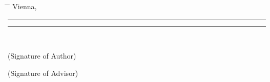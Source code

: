 \begin{center}
\begin{minipage}[t][1.5cm][t]{\textwidth}%
  \vspace{0pt}\sffamily\thesistitlefontnormalsize
  \begin{tabbing}%
    \hspace{45mm} \= \hspace{63mm} \= \hspace{51mm} \kill
    Vienna, \tuinfthesisdate \> {\raggedright\rule{51mm}{0.5pt}} \> {\raggedright\rule{51mm}{0.5pt}} \\
    \> \begin{minipage}[t][0.5cm][t]{51mm}\centering (Signature of Author)\end{minipage}
    \> \begin{minipage}[t][0.5cm][t]{51mm}\centering (Signature of Advisor)\end{minipage}
    \end{tabbing}
\end{minipage}

\end{center}

\pagestyle{empty}
\cleardoublepage


\setlength{\baselineskip}{\tmpbaselineskip}
\setlength{\parindent}{\tmpparindent}

\restoregeometry


